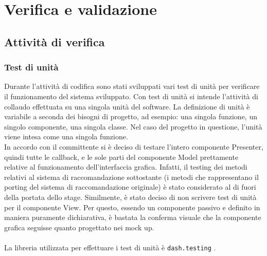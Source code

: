 
\chapter{Verifica e validazione}
\label{cap6}

\section{Attività di verifica}
\subsection{Test di unità}
Durante l'attività di codifica sono stati sviluppati vari test di unità per verificare il funzionamento del sistema sviluppato. Con test di unità si intende l'attività di collaudo effettuata su una singola unità del software. La definizione di unità è variabile a seconda dei bisogni di progetto, ad esempio: una singola funzione, un singolo componente, una singola classe.
Nel caso del progetto in questione, l'unità viene intesa come una singola funzione.
\\
In accordo con il committente si è deciso di testare l'intero componente Presenter, quindi tutte le callback, e le sole parti del componente Model prettamente relative al funzionamento dell'interfaccia grafica. Infatti, il testing dei metodi relativi al sistema di raccomandazione sottostante (i metodi che rappresentano il \gls{porting} del sistema di raccomandazione originale) è stato considerato al di fuori della portata dello stage.
Similmente, è stato deciso di non scrivere test di unità per il componente View. Per questo, essendo un componente passivo e definito in maniera puramente dichiarativa, è bastata la conferma visuale che la componente grafica seguisse quanto progettato nei \gls{mock up}.
\\ \\
La libreria utilizzata per effettuare i test di unità è \texttt{dash.testing} \cite{site:dash-testing}.

